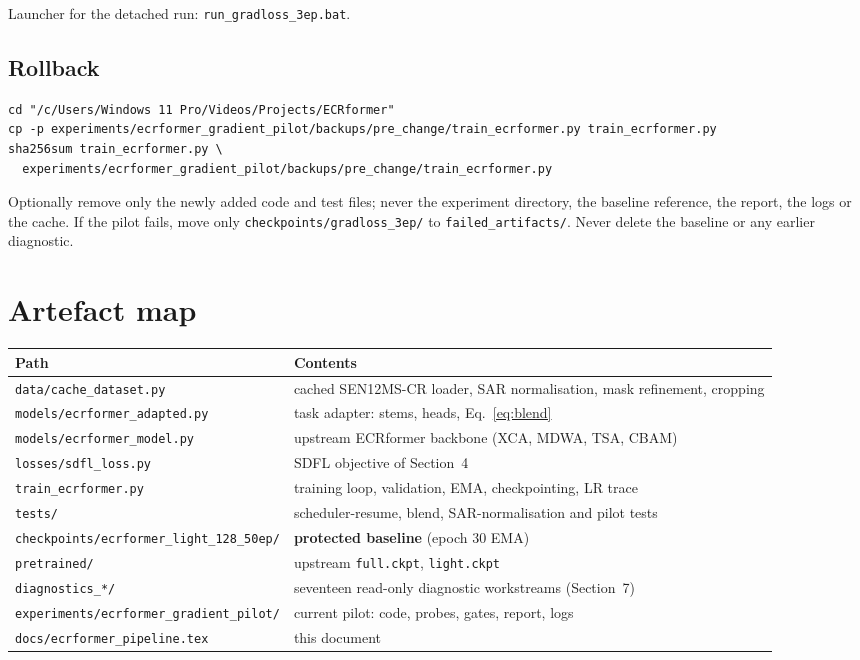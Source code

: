 \documentclass[10pt,a4paper]{article}
\newcommand{\code}[1]{\texttt{#1}}
\begin{document}
Launcher for the detached run: \code{run\_gradloss\_3ep.bat}.

\subsection{Rollback}

\begin{lstlisting}
cd "/c/Users/Windows 11 Pro/Videos/Projects/ECRformer"
cp -p experiments/ecrformer_gradient_pilot/backups/pre_change/train_ecrformer.py train_ecrformer.py
sha256sum train_ecrformer.py \
  experiments/ecrformer_gradient_pilot/backups/pre_change/train_ecrformer.py
\end{lstlisting}

Optionally remove only the newly added code and test files; never the experiment directory, the
baseline reference, the report, the logs or the cache. If the pilot fails, move only
\code{checkpoints/gradloss\_3ep/} to \code{failed\_artifacts/}. Never delete the baseline or any
earlier diagnostic.

\section{Artefact map}

\begin{center}
\begin{tabular}{@{}lp{9.3cm}@{}}
\hline
Path & Contents \\
\hline
\code{data/cache\_dataset.py} & cached SEN12MS-CR loader, SAR normalisation, mask refinement, cropping \\
\code{models/ecrformer\_adapted.py} & task adapter: stems, heads, Eq.~\eqref{eq:blend} \\
\code{models/ecrformer\_model.py} & upstream ECRformer backbone (XCA, MDWA, TSA, CBAM) \\
\code{losses/sdfl\_loss.py} & SDFL objective of Section~4 \\
\code{train\_ecrformer.py} & training loop, validation, EMA, checkpointing, LR trace \\
\code{tests/} & scheduler-resume, blend, SAR-normalisation and pilot tests \\
\code{checkpoints/ecrformer\_light\_128\_50ep/} & \textbf{protected baseline} (epoch 30 EMA) \\
\code{pretrained/} & upstream \code{full.ckpt}, \code{light.ckpt} \\
\code{diagnostics\_*/} & seventeen read-only diagnostic workstreams (Section~7) \\
\code{experiments/ecrformer\_gradient\_pilot/} & current pilot: code, probes, gates, report, logs \\
\code{docs/ecrformer\_pipeline.tex} & this document \\
\hline
\end{tabular}
\end{center}
\end{document}
